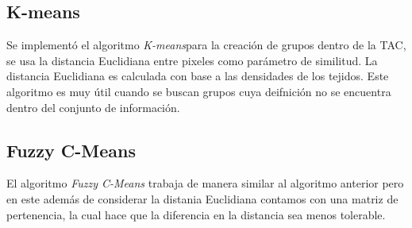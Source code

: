 \documentclass[12pt]{report}
\begin{document}
\subsection{K-means}
Se implementó el algoritmo \textit{K-means}para la creación de grupos dentro de la TAC, se usa la distancia Euclidiana entre pixeles como parámetro de similitud. La distancia Euclidiana es calculada con base a las densidades de los tejidos. Este algoritmo es muy útil cuando se buscan grupos cuya deifnición no se encuentra dentro del conjunto de información.

\subsection{Fuzzy C-Means}
El algoritmo \textit{Fuzzy C-Means} trabaja de manera similar al algoritmo anterior pero en este además de considerar la distania Euclidiana contamos con una matriz de pertenencia, la cual hace que la diferencia en la distancia sea menos tolerable.



\end{document}
